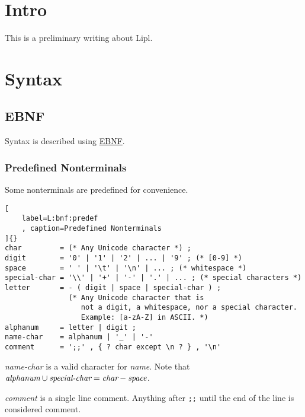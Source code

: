 \documentclass[12pt,letterpaper,notitlepage]{article}
\author{Samuel Lee}
\title{\lipl}
\newcommand{\lipl}{Lipl}
\begin{document}
\maketitle

\section{Intro}

This is a preliminary writing about \lipl.

\section{Syntax}

\subsection{EBNF}
\label{S:ebnf}

Syntax is described using
\href{http://en.wikipedia.org/wiki/Extended_Backus%E2%80%93Naur_form}{EBNF}.

\subsubsection{Predefined Nonterminals}

Some nonterminals are predefined for convenience.

\begin{lstlisting}[
    label=L:bnf:predef
    , caption=Predefined Nonterminals
]{}
char         = (* Any Unicode character *) ;
digit        = '0' | '1' | '2' | ... | '9' ; (* [0-9] *)
space        = ' ' | '\t' | '\n' | ... ; (* whitespace *)
special-char = '\\' | '+' | '-' | '.' | ... ; (* special characters *)
letter       = - ( digit | space | special-char ) ;
               (* Any Unicode character that is
                  not a digit, a whitespace, nor a special character.
                  Example: [a-zA-Z] in ASCII. *)
alphanum     = letter | digit ;
name-char    = alphanum | '_' | '-'
comment      = ';;' , { ? char except \n ? } , '\n'
\end{lstlisting}

\emph{name-char} is a valid character for \emph{name}.
Note that
$\emph{alphanum} \cup \emph{special-char} = \emph{char} - \emph{space}$.

\emph{comment} is a single line comment. Anything after \verb!;;! until
the end of the line is considered comment.
\end{document}
